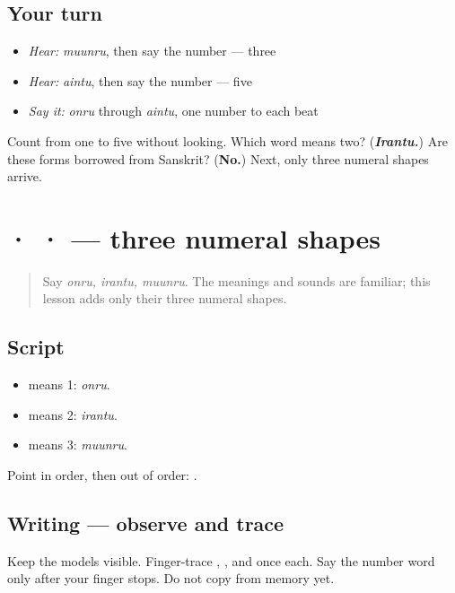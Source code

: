 \subsection*{Your turn}
\begin{itemize}
\raggedright
  \item \emph{Hear:} \emph{muunru}, then say the number — three
  \item \emph{Hear:} \emph{aintu}, then say the number — five
  \item \emph{Say it:} \emph{onru} through \emph{aintu}, one number to each beat
\end{itemize}

\begin{tcolorbox}[breakable,colback=teal!4,colframe=teal!35!black,title={Before you move on}]
Count from one to five without looking. Which word means two? (\emph{\textbf{Irantu.}}) Are these forms borrowed from Sanskrit? (\textbf{No.}) Next, only three numeral shapes arrive.
\end{tcolorbox}
\section[\texorpdfstring{\ta{௧} \ta{௨} \ta{௩} (one, two, three)}{௧ ௨ ௩ (one, two, three)}]{ ·  ·  — three numeral shapes}

\label{lesson:TA-W07-digits-1-3}



\begin{quote}
Say \emph{onru, irantu, muunru}. The meanings and sounds are familiar; this lesson adds only their three numeral shapes.
\end{quote}

\subsection*{Script}
\begin{itemize}
\raggedright
  \item \textbf{} means 1: \emph{onru}.
  \item \textbf{} means 2: \emph{irantu}.
  \item \textbf{} means 3: \emph{muunru}.
\end{itemize}

Point in order, then out of order: \textbf{  }.

\subsection*{Writing — observe and trace}
Keep the models visible. Finger-trace \textbf{}, \textbf{}, and \textbf{} once each. Say the number word only after your finger stops. Do not copy from memory yet.

